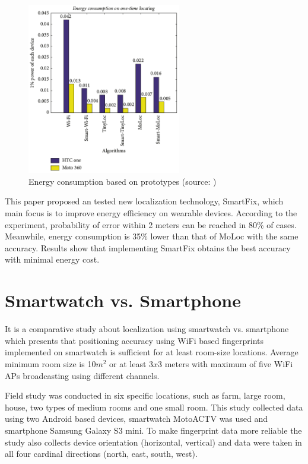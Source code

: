 \begin{figure}[H]
	\begin{centering}
		\includegraphics[width=0.6\textwidth]{img/smart_fix}
		\par\end{centering}
	\caption{Energy consumption based on prototypes (source: \cite{SmartFix})\label{fig:SmartFix}}
	\label{fig01c03}
\end{figure}

This paper proposed an tested new localization technology, SmartFix, which main focus is to improve energy efficiency on wearable devices. According to the experiment, probability of error within 2 meters can be reached in 80\% of cases. Meanwhile, energy consumption is 35\% lower than that of MoLoc with the same accuracy. Results show that implementing SmartFix obtains the best accuracy with minimal energy cost.

\section{Smartwatch vs. Smartphone}\label{sec:SWvsSP}
It is a comparative study about localization using smartwatch vs. smartphone \cite{SWvsSP} which presents that positioning accuracy using WiFi based fingerprints implemented on smartwatch is sufficient for at least room-size locations. Average minimum room size is 10$m^2$ or at least 3$x$3 meters with maximum of five WiFi APs broadcasting using different channels.

Field study was conducted in six specific locations, such as farm, large room, house, two types of medium rooms and one small room. This study collected data using two Android based devices, smartwatch MotoACTV was used and smartphone Samsung Galaxy S3 mini. To make fingerprint data more reliable the study also collects device orientation (horizontal, vertical) and data were taken in all four cardinal directions (north, east, south, west).

